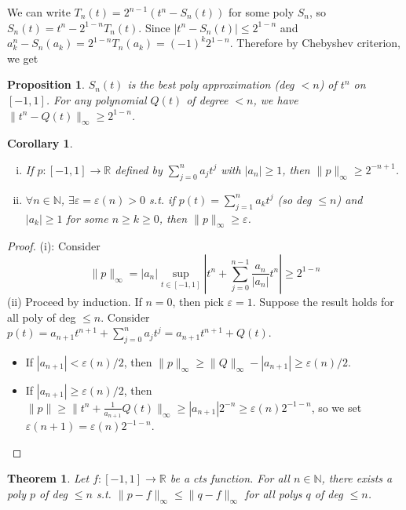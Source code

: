 \documentclass{article}
\theoremstyle{definition}
\theoremstyle{remark}
\theoremstyle{plain}
\newtheorem{thm}[defn]{Theorem}
\newtheorem{prop}[defn]{Proposition}
\newtheorem{crly}[defn]{Corollary}
\newcommand{\NN}{\mathbb{N}}
\newcommand{\RR}{\mathbb{R}}
\begin{document}
We can write $T_n(t)=2^{n-1}(t^n-S_n(t))$ for some poly $S_n$, so $S_n(t)=t^n-2^{1-n}T_n(t)$. Since $|t^n-S_n(t)|\le 2^{1-n}$ and $a_k^n-S_n(a_k)=2^{1-n}T_n(a_k)=(-1)^k2^{1-n}$. Therefore by Chebyshev criterion, we get
\begin{prop}
    $S_n(t)$ is the best poly approximation (deg $<n$) of $t^n$ on $[-1,1]$. For any polynomial $Q(t)$ of degree $<n$, we have $\|t^n-Q(t)\|_\infty\ge 2^{1-n}$.
\end{prop}
\begin{crly}\
    \begin{enumerate}[(i)]
        \item If $p:[-1,1]\to\RR$ defined by $\sum_{j=0}^na_jt^j$ with $|a_n|\ge 1$, then $\|p\|_\infty\ge 2^{-n+1}$.
        \item $\forall n\in\NN$, $\exists\varepsilon=\varepsilon(n)>0$ s.t. if $p(t)=\sum_{j=1}^na_kt^j$ (so deg $\le n$) and $|a_k|\ge 1$ for some $n\ge k\ge 0$, then $\|p\|_\infty\ge\varepsilon$.
    \end{enumerate}
\end{crly}
\begin{proof}
    (i): Consider
    \[\|p\|_\infty=|a_n|\sup_{t\in[-1,1]}\left|t^n+\sum_{j=0}^{n-1}\frac{a_n}{|a_n|}t^n\right|\ge 2^{1-n}\]
    (ii) Proceed by induction. If $n=0$, then pick $\varepsilon=1$. Suppose the result holds for all poly of deg $\le n$. Consider $p(t)=a_{n+1}t^{n+1}+\sum_{j=0}^na_jt^j=a_{n+1}t^{n+1}+Q(t)$.
    \begin{itemize}
        \item If $|a_{n+1}|<\varepsilon(n)/2$, then $\|p\|_\infty\ge\|Q\|_\infty-|a_{n+1}|\ge\varepsilon(n)/2$.
        \item If $|a_{n+1}|\ge\varepsilon(n)/2$, then $\|p\|\ge \|t^n+\frac{1}{a_{n+1}}Q(t)\|_\infty\ge |a_{n+1}|2^{-n}\ge\varepsilon(n)2^{-1-n}$, so we set $\varepsilon(n+1)=\varepsilon(n)2^{-1-n}$.
    \end{itemize} 
\end{proof}
\begin{thm}
    Let $f:[-1,1]\to\RR$ be a cts function. For all $n\in\NN$, there exists a poly $p$ of deg $\le n$ s.t. $\|p-f\|_\infty\le\|q-f\|_\infty$ for all polys $q$ of deg $\le n$.
\end{thm}
\end{document}
